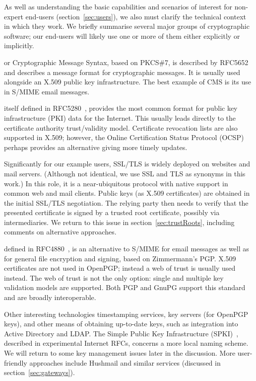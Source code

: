 \documentclass{article}
\def\cite{\citep}
\begin{document}
As well as understanding the basic capabilities and scenarios of interest
for non-expert end-users (section~\ref{sec:users}), we also must clarify the technical context in
which they work. We briefly summarise several major groups of cryptographic software;
our end-users will likely use one or more of them either
explicitly or implicitly.
\begin{description}\def\makelabel#1{\it #1}
\item[CMS] or Cryptographic Message Syntax, based on PKCS\#7, is described by
RFC5652~\cite{RFC5652} and describes a message format for
cryptographic messages.  It is usually used alongside an X.509
public key infrastructure.  The best example of CMS is its use in
S/MIME email messages.
\item[X.509]  itself defined in RFC5280~\cite{RFC5280},
provides the most common format for  public key  infrastructure (PKI) data for the
Internet.  This usually leads directly to the certificate authority
trust/validity model.  
Certificate revocation lists are also supported in X.509; however, the Online Certification Status Protocol (OCSP)~\cite{RFC2560} perhaps provides an alternative giving more timely updates.
\item[SSL/TLS]   Significantly for our example users, SSL/TLS is widely
  deployed on websites and mail servers.  (Although not identical, we use SSL and TLS as synonyms in this work.)  In this role, it is a
  near-ubiquitous protocol with  native support in common web and
  mail clients.  
  Public keys (as X.509 certificates) are obtained in the initial SSL/TLS negotiation.  
  The relying party then needs to verify that the presented certificate is signed by a trusted root certificate, possibly via intermediaries. 
  We return to this issue in section~\ref{sec:trustRoots}, including comments on alternative approaches.
\item[OpenPGP] defined in RFC4880~\cite{RFC4880}, is an alternative to
  S/MIME for email messages as well as for general file encryption and
  signing, based on Zimmermann's PGP.  X.509 
  certificates are not used in OpenPGP; instead a web of trust is
  usually used instead.  The web of trust is not the only option:  single
  and multiple key validation models are supported.  
  Both PGP and GnuPG support this standard and are broadly interoperable.
\end{description}

Other interesting technologies timestamping services, key servers (for
OpenPGP keys), and other means of obtaining up-to-date keys, such as
integration into Active Directory and LDAP.  The Simple Public Key
Infrastructure
(SPKI)~\cite{RFC2692,RFC2693,mSPKI},
described in experimental Internet RFCs, concerns a more local naming
scheme.  We will return to some key management issues later in the
discussion.  More user-friendly approaches include Hushmail and
similar services (discussed in section~\ref{sec:gateways}).
\end{document}
